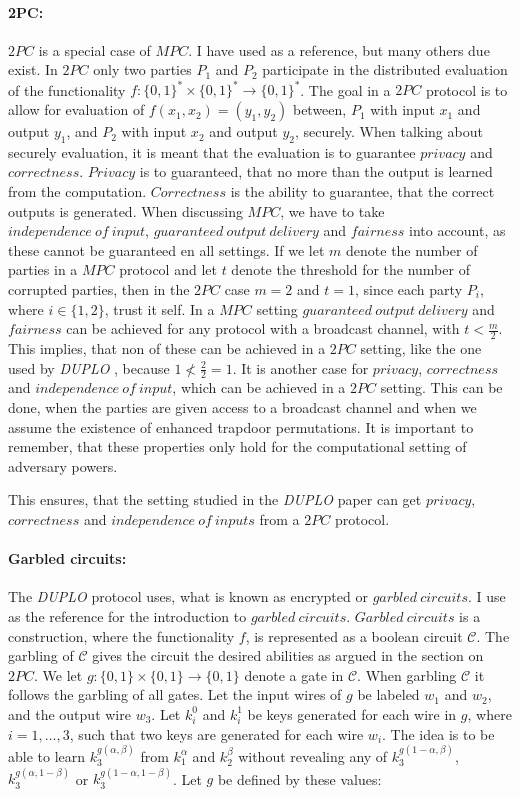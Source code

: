 \documentclass[twoside,11pt,openright]{report}
\newcommand{\DUPLO}{\textit{DUPLO} }
\begin{document}
\paragraph{2PC:}
$2PC$ is a special case of $MPC$. I have used \cite{estpp} as a reference, but many others due exist. In $2PC$ only two parties $P_1$ and $P_2$ participate in the distributed evaluation of the functionality $f: \{0,1\}^* \times \{0,1\}^* \to \{0,1\}^*$. The goal in a $2PC$ protocol is to allow for evaluation of $f(x_1,x_2)=(y_1,y_2)$ between, $P_1$ with input $x_1$ and output $y_1$, and $P_2$ with input $x_2$ and output $y_2$, securely. When talking about securely evaluation, it is meant that the evaluation is to guarantee $privacy$ and $correctness$. $Privacy$ is to guaranteed, that no more than the output is learned from the computation. $Correctness$ is the ability to guarantee, that the correct outputs is generated. When discussing $MPC$, we have to take $independence~of~input$, $guaranteed~output~delivery$ and $fairness$ into account, as these cannot be guaranteed en all settings. If we let $m$ denote the number of parties in a $MPC$ protocol and let $t$ denote the threshold for the number of corrupted parties, then in the $2PC$ case $m=2$ and $t=1$, since each party $P_i$, where $i\in\{1,2\}$, trust it self. In a $MPC$ setting $guaranteed~output~delivery$ and $fairness$ can be achieved for any protocol with a broadcast channel, with $t<\frac{m}{2}$. This implies, that non of these can be achieved in a $2PC$ setting, like the one used by \DUPLO, because $1\not<\frac{2}{2}=1$. It is another case for $privacy$, $correctness$ and $independence~of~input$, which can be achieved in a $2PC$ setting. This can be done, when the parties are given access to a broadcast channel and when we assume the existence of enhanced trapdoor permutations. It is important to remember, that these properties only hold for the computational setting of adversary powers.

This ensures, that the setting studied in the \DUPLO paper can get $privacy$, $correctness$ and $independence~of~inputs$ from a $2PC$ protocol.

\paragraph{Garbled circuits:} 
The \DUPLO protocol uses, what is known as encrypted or $garbled~circuits$. I use \cite{estpp} as the reference for the introduction to $garbled~circuits$. $Garbled~circuits$ is a construction, where the functionality $f$, is represented as a boolean circuit $\mathcal{C}$. The garbling of $\mathcal{C}$ gives the circuit the desired abilities as argued in the section on $2PC$. We let $g:\{0,1\}\times \{0,1\} \to \{0,1\}$ denote a gate in $\mathcal{C}$. When garbling $\mathcal{C}$ it follows the garbling of all gates. Let the input wires of $g$ be labeled $w_1$ and $w_2$, and the output wire $w_3$. Let $k^0_i$ and $k^1_i$ be keys generated for each wire in $g$, where $i=1,\dots,3$, such that two keys are generated for each wire $w_i$. The idea is to be able to learn $k^{g(\alpha,\beta)}_3$ from $k^\alpha_1$ and $k^\beta_2$ without revealing any of $k^{g(1-\alpha,\beta)}_3$, $k^{g(\alpha,1-\beta)}_3$ or $k^{g(1-\alpha,1-\beta)}_3$. Let $g$ be defined by these values:
\end{document}
